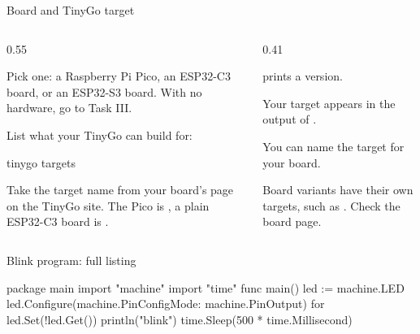 \documentclass[10pt,aspectratio=169,t]{beamer}
\begin{document}
\begin{frame}[fragile,embedded,eyebrow=Task I]{Board and TinyGo target}
  \begin{columns}[T]
    \begin{column}{0.55\textwidth}
      \begin{steps}
        \item Pick one: a Raspberry Pi Pico, an ESP32-C3 board, or an ESP32-S3 board. With no hardware, go to Task III.
        \item List what your TinyGo can build for:
\begin{shell}
tinygo targets
\end{shell}
        \item Take the target name from your board's page on the TinyGo site. The Pico is , a plain ESP32-C3 board is .
      \end{steps}
    \end{column}
    \begin{column}{0.41\textwidth}
      \begin{checklist}
        \item {} prints a version.
        \item Your target appears in the output of .
        \item You can name the target for your board.
      \end{checklist}
      \begin{warning}
        Board variants have their own targets, such as . Check the board page.
      \end{warning}
    \end{column}
  \end{columns}
\end{frame}

\begin{frame}[fragile,embedded,eyebrow=Reference]{Blink program: full listing}
\begin{golang}
package main
import "machine"
import "time"
func main() {
    led := machine.LED
    led.Configure(machine.PinConfig{Mode: machine.PinOutput})
    for {
        led.Set(!led.Get())
        println("blink")
        time.Sleep(500 * time.Millisecond)
    }
}
\end{golang}
\end{frame}
\end{document}
